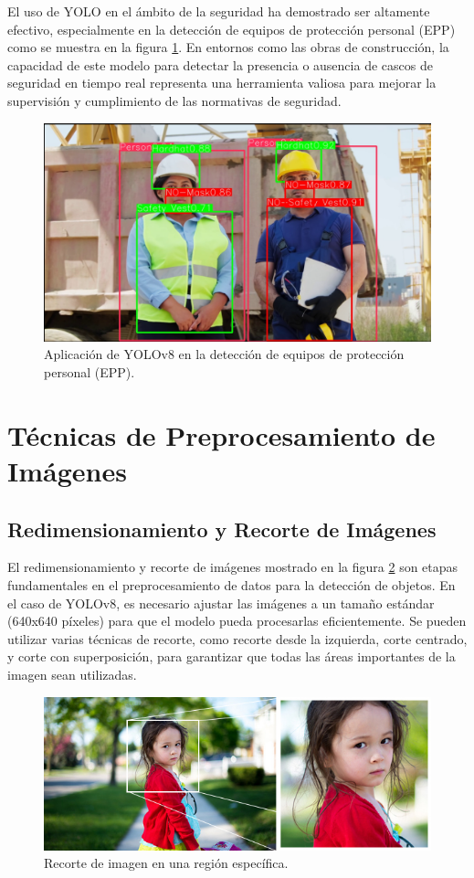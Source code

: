 El uso de YOLO en el ámbito de la seguridad ha demostrado ser altamente efectivo, especialmente en la detección de equipos de protección personal (EPP) como se muestra en la figura \ref{fig:yolo_application}. En entornos como las obras de construcción, la capacidad de este modelo para detectar la presencia o ausencia de cascos de seguridad en tiempo real representa una herramienta valiosa para mejorar la supervisión y cumplimiento de las normativas de seguridad.

\begin{figure}[!ht]
  \centering
  \includegraphics[width=.49\linewidth]{images/yolo_application.png}
  \caption{Aplicación de YOLOv8 en la detección de equipos de protección personal (EPP).}
  \label{fig:yolo_application}
\end{figure}

\section{Técnicas de Preprocesamiento de Imágenes}

\subsection{Redimensionamiento y Recorte de Imágenes}

El redimensionamiento y recorte de imágenes mostrado en la figura \ref{fig:image_cropping} son etapas fundamentales en el preprocesamiento de datos para la detección de objetos. En el caso de YOLOv8, es necesario ajustar las imágenes a un tamaño estándar (640x640 píxeles) para que el modelo pueda procesarlas eficientemente. Se pueden utilizar varias técnicas de recorte, como recorte desde la izquierda, corte centrado, y corte con superposición, para garantizar que todas las áreas importantes de la imagen sean utilizadas.

\begin{figure}[!ht]
  \centering
  \includegraphics[width=.49\linewidth]{images/cropping.jpg}
  \caption{Recorte de imagen en una región específica.}
  \label{fig:image_cropping}
\end{figure}

